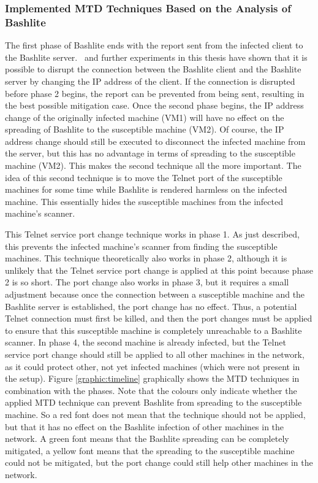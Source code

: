 \subsubsection{Implemented MTD Techniques Based on the Analysis of Bashlite}
The first phase of Bashlite ends with the report sent from the infected client to the Bashlite server.~\cite{article:vonderAssen} and further experiments in this thesis have shown that it is possible to disrupt the connection between the Bashlite client and the Bashlite server by changing the IP address of the client. If the connection is disrupted before phase 2 begins, the report can be prevented from being sent, resulting in the best possible mitigation case. Once the second phase begins, the IP address change of the originally infected machine (VM1) will have no effect on the spreading of Bashlite to the susceptible machine (VM2). Of course, the IP address change should still be executed to disconnect the infected machine from the server, but this has no advantage in terms of spreading to the susceptible machine (VM2). This makes the second technique all the more important. The idea of this second technique is to move the Telnet port of the susceptible machines for some time while Bashlite is rendered harmless on the infected machine. This essentially hides the susceptible machines from the infected machine's scanner. 

This Telnet service port change technique works in phase 1. As just described, this prevents the infected machine's scanner from finding the susceptible machines. This technique theoretically also works in phase 2, although it is unlikely that the Telnet service port change is applied at this point because phase 2 is so short. The port change also works in phase 3, but it requires a small adjustment because once the connection between a susceptible machine and the Bashlite server is established, the port change has no effect. Thus, a potential Telnet connection must first be killed, and then the port changes must be applied to ensure that this susceptible machine is completely unreachable to a Bashlite scanner. In phase 4, the second machine is already infected, but the Telnet service port change should still be applied to all other machines in the network, as it could protect other, not yet infected machines (which were not present in the setup). Figure \ref{graphic:timeline} graphically shows the MTD techniques in combination with the phases. Note that the colours only indicate whether the applied MTD technique can prevent Bashlite from spreading to the susceptible machine. So a red font does not mean that the technique should not be applied, but that it has no effect on the Bashlite infection of other machines in the network. A green font means that the Bashlite spreading can be completely mitigated, a yellow font means that the spreading to the susceptible machine could not be mitigated, but the port change could still help other machines in the network. 

